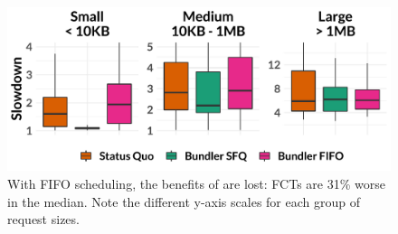 \begin{figure}
    \centering
\begin{knitrout}
\color{fgcolor}
\includegraphics[width=\maxwidth]{figure/eval:fifo-1} 

\end{knitrout}
    \caption{With FIFO scheduling, the benefits of \name are lost: FCTs are 31\% worse in the median. Note the different y-axis scales for each group of request sizes.}
    \label{fig:eval:fifo}
\end{figure}
\newcommand{\overviewBenefitsFifoMedian}{2.13\xspace}
\newcommand{\overviewBenefitsFifoWorse}{31\%\xspace}
